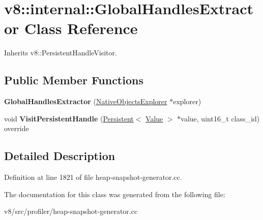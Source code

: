 \hypertarget{classv8_1_1internal_1_1GlobalHandlesExtractor}{}\section{v8\+:\+:internal\+:\+:Global\+Handles\+Extractor Class Reference}
\label{classv8_1_1internal_1_1GlobalHandlesExtractor}


Inherits v8\+::\+Persistent\+Handle\+Visitor.

\subsection*{Public Member Functions}
\begin{DoxyCompactItemize}
\item 
\mbox{\label{classv8_1_1internal_1_1GlobalHandlesExtractor_a7bf2d1963cb622b0a74570723b6d43d4}} 
{\bfseries Global\+Handles\+Extractor} (\mbox{\hyperlink{classv8_1_1internal_1_1NativeObjectsExplorer}{Native\+Objects\+Explorer}} $\ast$explorer)
\item 
\mbox{\label{classv8_1_1internal_1_1GlobalHandlesExtractor_a0e27042611b106303f75b342cf9cf5dd}} 
void {\bfseries Visit\+Persistent\+Handle} (\mbox{\hyperlink{classv8_1_1Persistent}{Persistent}}$<$ \mbox{\hyperlink{classv8_1_1Value}{Value}} $>$ $\ast$value, uint16\+\_\+t class\+\_\+id) override
\end{DoxyCompactItemize}


\subsection{Detailed Description}


Definition at line 1821 of file heap-\/snapshot-\/generator.\+cc.



The documentation for this class was generated from the following file\+:\begin{DoxyCompactItemize}
\item 
v8/src/profiler/heap-\/snapshot-\/generator.\+cc\end{DoxyCompactItemize}
